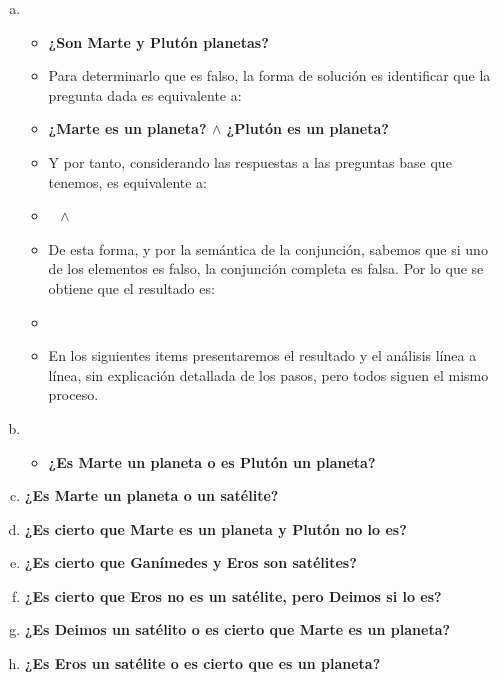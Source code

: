 \begin{solution}
    \begin{enumerate}[a)]
        \item
            \begin{itemize}[label=, leftmargin=0mm,itemsep=8pt]
                \item \textbf{¿Son Marte y Plutón planetas?} \lfalsefull
                \item Para determinarlo que es falso, la forma de solución es identificar que la pregunta dada es equivalente a:
                \item \textbf{¿Marte es un planeta? $\land$ ¿Plutón es un planeta?}
                \item Y por tanto, considerando las respuestas a las preguntas base que tenemos, es equivalente a:
                \item \ltruefull ~ $\land$ ~ \lfalsefull
                \item De esta forma, y por la semántica de la conjunción, sabemos que si uno de los elementos es falso, la conjunción completa es falsa. Por lo que se obtiene que el resultado es:
                \item \lfalsefull
                \item En los siguientes items presentaremos el resultado y el análisis línea a línea, sin explicación detallada de los pasos, pero todos siguen el mismo proceso.
            \end{itemize}
        \item
            \begin{itemize}[label=, leftmargin=0mm,itemsep=8pt]
                \item \textbf{¿Es Marte un planeta o es Plutón un planeta?}
            \end{itemize}
        \item \textbf{¿Es Marte un planeta o un satélite?}
        \item \textbf{¿Es cierto que Marte es un planeta y Plutón no lo es?}
        \item \textbf{¿Es cierto que Ganímedes y Eros son satélites?}
        \item \textbf{¿Es cierto que Eros no es un satélite, pero Deimos si lo
        es?}
        \item \textbf{¿Es Deimos un satélito o es cierto que Marte es un
        planeta?}
        \item \textbf{¿Es Eros un satélite o es cierto que es un planeta?}
    \end{enumerate}
\end{solution}

